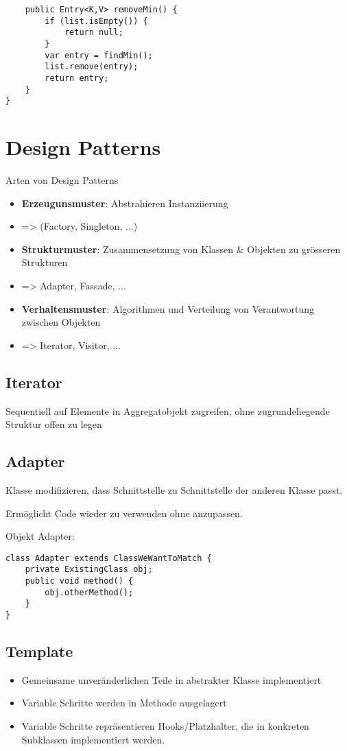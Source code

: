 \begin{multicols*}{4}
\begin{lstlisting}
	public Entry<K,V> removeMin() {
		if (list.isEmpty()) {
			return null;
		}
		var entry = findMin();
		list.remove(entry);
		return entry;
	}
}
	\end{lstlisting}

\section{Design Patterns}
	Arten von Design Patterns
	\begin{itemize}
		\item \textbf{Erzeugunsmuster}: Abstrahieren Instanziierung 
		\item => (Factory, Singleton, ...)
		\item \textbf{Strukturmuster}: Zusammensetzung von Klassen \& Objekten zu grösseren Strukturen
		\item => Adapter, Fassade, ...
		\item \textbf{Verhaltensmuster}: Algorithmen und Verteilung von Verantwortung zwischen Objekten
		\item => Iterator, Visitor, ...
	\end{itemize}
	\subsection{Iterator}
	Sequentiell auf Elemente in Aggregatobjekt zugreifen, ohne zugrundeliegende Struktur offen zu legen
	
	\subsection{Adapter}
	Klasse modifizieren, dass Schnittstelle zu Schnittstelle der anderen Klasse passt.
	
	Ermöglicht Code wieder zu verwenden ohne anzupassen.
	
	Objekt Adapter:
	\begin{lstlisting}
class Adapter extends ClassWeWantToMatch {
	private ExistingClass obj;
	public void method() {
		obj.otherMethod();
	}
}
	\end{lstlisting}

	\subsection{Template}
	\begin{itemize}
		\item Gemeinsame unveränderlichen Teile in abstrakter Klasse implementiert
		\item Variable Schritte werden in Methode ausgelagert
		\item Variable Schritte repräsentieren Hooks/Platzhalter, die in konkreten Subklassen implementiert werden.
	\end{itemize}


\end{multicols*}
